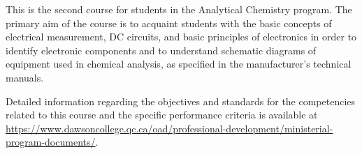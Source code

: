 {This is the second course for students in the Analytical Chemistry program. The primary aim of the course is to acquaint students with the basic concepts of electrical measurement, DC circuits, and basic principles of electronics in order to identify electronic components and to understand schematic diagrams of equipment used in chemical analysis, as specified in the manufacturer's technical manuals.
\smallskip


Detailed information regarding the objectives and standards for the competencies related to this course and the specific performance criteria is available at \url{https://www.dawsoncollege.qc.ca/oad/professional-development/ministerial-program-documents/}.}
